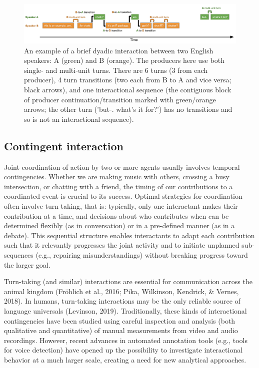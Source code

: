\documentclass[10pt, letterpaper]{article}
\newenvironment{CodeChunk}{}{}
\begin{document}
\begin{CodeChunk}
\begin{figure}[h]

{\centering \includegraphics{figs/minisequence-1} 

}

\caption[An example of a brief dyadic interaction between two English speakers]{An example of a brief dyadic interaction between two English speakers: A (green) and B (orange). The producers here use both single- and multi-unit turns. There are 6 turns (3 from each producer), 4 turn transitions (two each from B to A and vice versa; black arrows), and one interactional sequence (the contiguous block of producer continuation/transition marked with green/orange arrows; the other turn ('but-. what's it for?') has no transitions and so is not an interactional sequence).}\label{fig:minisequence}
\end{figure}
\end{CodeChunk}

\hypertarget{contingent-interaction}{%
\subsection{Contingent interaction}\label{contingent-interaction}}

Joint coordination of action by two or more agents usually involves
temporal contingencies. Whether we are making music with others,
crossing a busy intersection, or chatting with a friend, the timing of
our contributions to a coordinated event is crucial to its success.
Optimal strategies for coordination often involve turn taking, that is:
typically, only one interactant makes their contribution at a time, and
decisions about who contributes when can be determined flexibly (as in
conversation) or in a pre-defined manner (as in a debate). This
sequential structure enables interactants to adapt each contribution
such that it relevantly progresses the joint activity and to initiate
unplanned sub-sequences (e.g., repairing misunderstandings) without
breaking progress toward the larger goal.

Turn-taking (and similar) interactions are essential for communication
across the animal kingdom (Fröhlich et al., 2016; Pika, Wilkinson,
Kendrick, \& Vernes, 2018). In humans, turn-taking interactions may be
the only reliable source of language universals (Levinson, 2019).
Traditionally, these kinds of interactional contingencies have been
studied using careful inspection and analysis (both qualitative and
quantitative) of manual measurements from video and audio recordings.
However, recent advances in automated annotation tools (e.g., tools for
voice detection) have opened up the possibility to investigate
interactional behavior at a much larger scale, creating a need for new
analytical approaches.
\end{document}
